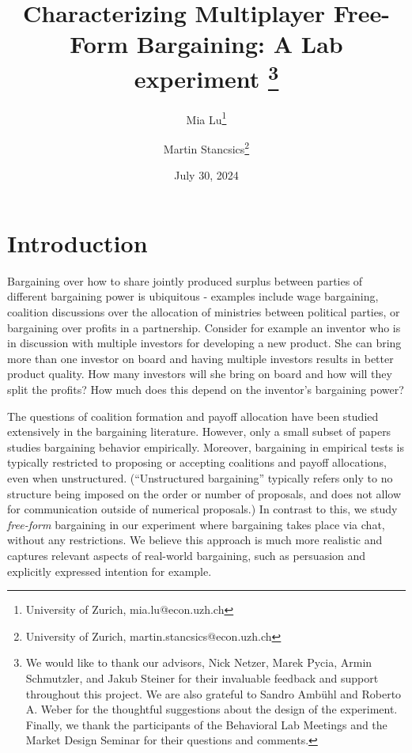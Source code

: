 \documentclass[12pt]{article}
\title{
    Characterizing Multiplayer Free-Form Bargaining: A Lab experiment%
    \thanks{
        We would like to thank our advisors, Nick Netzer, Marek Pycia, Armin Schmutzler, and Jakub Steiner for their invaluable feedback and support throughout this project.
        We are also grateful to Sandro Ambühl and Roberto A. Weber for the thoughtful suggestions about the design of the experiment.
        Finally, we thank the participants of the Behavioral Lab Meetings and the Market Design Seminar for their questions and comments.
    }
}
\author{\vspace*{0.5cm}
Mia Lu\thanks{University of Zurich, mia.lu@econ.uzh.ch} 
\and 
Martin Stancsics\thanks{University of Zurich, martin.stancsics@econ.uzh.ch}
}
\date{\vspace*{0.5cm} 
July 30, 2024\\
}
\begin{document}
\bgroup
\let\footnoterule\relax

\begin{singlespace}
\maketitle



\end{singlespace}
\thispagestyle{empty}

\clearpage

\setcounter{page}{1}




\newpage
\section{Introduction} \label{sec:intro}


Bargaining over how to share jointly produced surplus between parties of different bargaining power is ubiquitous - examples include wage bargaining, coalition discussions over the allocation of ministries between political parties, or bargaining over profits in a partnership. 
Consider for example an inventor who is in discussion with multiple investors for developing a new product. She can bring more than one investor on board and having multiple investors results in better product quality. How many investors will she bring on board and how will they split the profits? How much does this depend on the inventor's bargaining power?

The questions of coalition formation and payoff allocation have been studied extensively in the bargaining literature. However, only a small subset of papers studies bargaining behavior empirically. Moreover, bargaining in empirical tests is typically restricted to proposing or accepting coalitions and payoff allocations, even when unstructured. (``Unstructured bargaining'' typically refers only to no structure being imposed on the order or number of proposals, and does not allow for communication outside of numerical proposals.) In contrast to this, we study \emph{free-form} bargaining in our experiment where bargaining takes place via chat, without any restrictions. We believe this approach is much more realistic and captures relevant aspects of real-world bargaining, such as persuasion and explicitly expressed intention for example.
\end{document}
